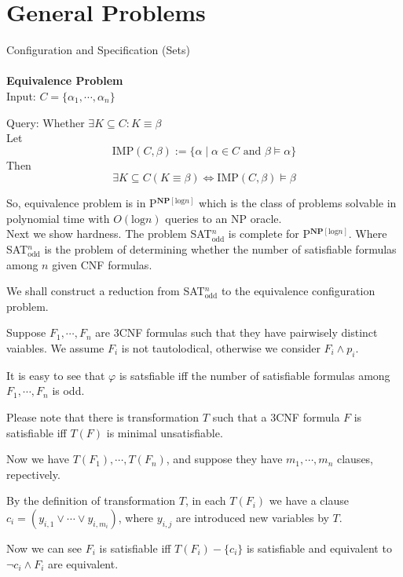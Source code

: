 \documentclass[12pt]{article}
\begin{document}
\section{General Problems}


Configuration and Specification (Sets)\\ \ \\

{\bf Equivalence Problem}\\

Input: $C=\{\alpha_1,\cdots,\alpha_n\}$

Query: Whether $\exists K\subseteq C: K\equiv \beta$\\

Let
$$\mbox{IMP}(C,\beta):=\{\alpha\mid \alpha\in C \mbox{ and }\beta\models \alpha\}$$
Then
$$\exists K\subseteq  C(K\equiv \beta)\Longleftrightarrow\mbox{IMP}(C,\beta)\models \beta$$

So, equivalence problem is in P$^{\textbf{NP}[\text{log} n]}$ which is the class of problems solvable in polynomial time with $O(\text{log}n)$ queries to an NP oracle.\\

Next we show hardness. The problem SAT$^n_{\text{odd}}$ is complete for P$^{\textbf{NP}[\text{log} n]}$. Where SAT$^n_{\text{odd}}$ is the problem of determining whether the number of satisfiable formulas among $n$ given CNF formulas.

We shall construct a reduction from SAT$^n_{\text{odd}}$ to the equivalence configuration problem. 

Suppose $F_1,\cdots, F_n$ are 3CNF formulas such that they have pairwisely distinct vaiables. We assume $F_i$ is not tautolodical, otherwise we consider $F_i\wedge p_i$. 
 
 
It is easy to see that $\varphi$ is satsfiable iff the number of satisfiable formulas among $F_1,\cdots, F_n$ is odd.  


Please note that there is transformation $T$ such that a 3CNF formula $F$ is satisfiable iff $T(F)$ is minimal unsatisfiable. 

Now we have $T(F_1),\cdots, T(F_n)$, and suppose they have $m_1,\cdots, m_n$ clauses, repectively.

By the definition of transformation $T$, in each $T(F_i)$ we have a clause $c_i=(y_{i,1}\vee \cdots\vee y_{i,m_i})$, where $y_{i,j}$ are introduced new variables by $T$.

Now we can see $F_i$ is satisfiable iff $T(F_i)-\{c_i\}$ is satisfiable and equivalent to $\neg c_i\wedge F_i$ are equivalent.
\end{document}
